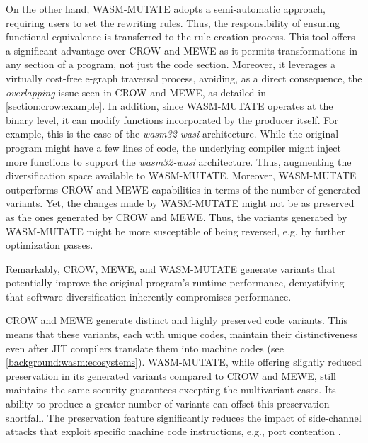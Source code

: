On the other hand, WASM-MUTATE adopts a semi-automatic approach, requiring users to set the rewriting rules. Thus, the responsibility of ensuring functional equivalence is transferred to the rule creation process.
This tool offers a significant advantage over CROW and MEWE as it permits transformations in any section of a \wasm program, not just the code section.
Moreover, it leverages a virtually cost-free e-graph traversal process, avoiding, as a direct consequence, the \emph{overlapping} issue seen in CROW and MEWE, as detailed in \autoref{section:crow:example}. 
In addition, since WASM-MUTATE operates at the binary level, it can modify functions incorporated by the \Wasm producer itself.
For example, this is the case of the \emph{wasm32-wasi} architecture.
While the original program might have a few lines of code, the underlying compiler might inject more functions to support the \emph{wasm32-wasi} architecture.
Thus, augmenting the diversification space available to WASM-MUTATE.
Moreover, WASM-MUTATE outperforms CROW and MEWE capabilities in terms of the number of generated variants.
Yet, the changes made by WASM-MUTATE might not be as preserved as the ones generated by CROW and MEWE.
Thus, the variants generated by WASM-MUTATE might be more susceptible of being reversed, e.g. by further optimization passes.

Remarkably, CROW, MEWE, and WASM-MUTATE generate variants that potentially improve the original program's runtime performance, demystifying that software diversification inherently compromises performance.

CROW and MEWE generate distinct and highly preserved code variants. 
This means that these variants, each with unique \Wasm codes, maintain their distinctiveness even after JIT compilers translate them into machine codes (see \autoref{background:wasm:ecosystems}). 
WASM-MUTATE, while offering slightly reduced preservation in its generated variants compared to CROW and MEWE, still maintains the same security guarantees excepting the multivariant cases.
Its ability to produce a greater number of variants can offset this preservation shortfall.
The preservation feature significantly reduces the impact of side-channel attacks that exploit specific machine code instructions, e.g., port contention \cite{10.1145/3488932.3517411}.


